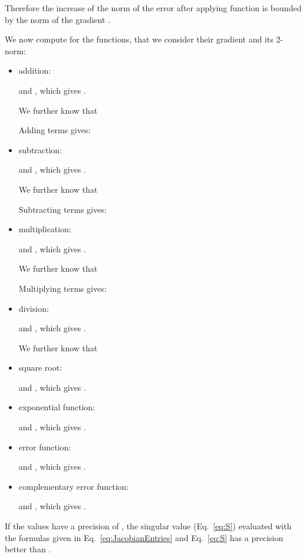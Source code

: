 \documentclass{article}
\begin{document}
Therefore the increase of the norm of the error after applying
function  is bounded by the norm of the gradient
.


We now compute for the functions, that we consider their gradient and
its 2-norm:  

\begin{itemize}
\item addition:

 and , which gives
.

We further know that


Adding  terms gives:



\item subtraction:

 and , which gives
.

We further know that


Subtracting  terms gives:


\item multiplication:

 and , which gives
.

We further know that


Multiplying  terms gives:



\item division:

 and , which gives
.

We further know that


\item square root:

 and , which gives
.

\item exponential function:

 and , which gives
.

\item error function:

 and , which gives
.

\item complementary error function:

 and , which gives
.
\end{itemize}



\begin{lemma}
If the values  have a precision of , 
the singular value (Eq.~\eqref{eq:S}) evaluated with the formulas 
given in Eq.~\eqref{eq:JacobianEntries} and Eq.~\eqref{eq:S} has 
a precision better than .  
\end{lemma}
\end{document}

